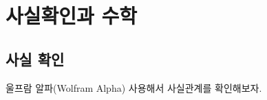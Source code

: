 \documentclass[
  letterpaper,
]{book}
\begin{document}
\begin{figure}
\begin{minipage}[t]{0.33\linewidth}
{}

\end{minipage}%
%
\begin{minipage}[t]{0.33\linewidth}

{\centering 


}

\end{minipage}%

\end{figure}

\hypertarget{uxc0acuxc2e4uxd655uxc778uxacfc-uxc218uxd559}{%
\section{사실확인과
수학}\label{uxc0acuxc2e4uxd655uxc778uxacfc-uxc218uxd559}}

\hypertarget{uxc0acuxc2e4-uxd655uxc778}{%
\subsection{사실 확인}\label{uxc0acuxc2e4-uxd655uxc778}}

울프람 알파(Wolfram Alpha) 사용해서 사실관계를 확인해보자.
\end{document}
